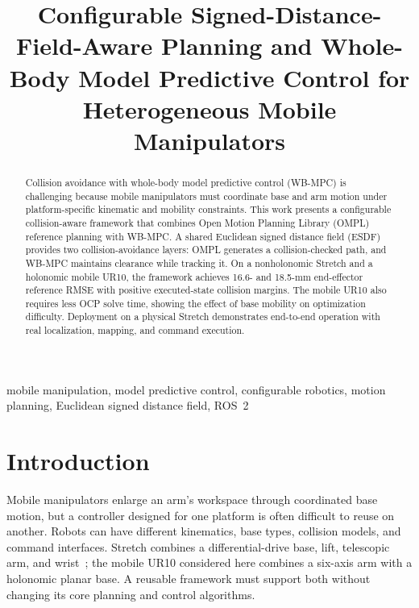 \documentclass[conference]{IEEEtran}
\begin{document}
\title{Configurable Signed-Distance-Field-Aware Planning and Whole-Body Model
Predictive Control for Heterogeneous Mobile Manipulators}

\author{
}

\maketitle

\begin{abstract}
Collision avoidance with whole-body model predictive control (WB-MPC) is
challenging because mobile manipulators must coordinate base and arm motion
under platform-specific kinematic and mobility constraints.  This work presents
a configurable collision-aware framework that combines Open Motion Planning
Library (OMPL) reference planning with WB-MPC.  A shared Euclidean signed
distance field (ESDF) provides two collision-avoidance layers: OMPL generates a
collision-checked path, and WB-MPC maintains clearance while tracking it.  On a
nonholonomic Stretch and a holonomic mobile UR10, the framework achieves 16.6-
and 18.5-mm end-effector reference RMSE with positive executed-state collision
margins.  The mobile UR10 also requires less OCP solve time, showing the effect
of base mobility on optimization difficulty.  Deployment on a physical Stretch
demonstrates end-to-end operation with real localization, mapping, and command
execution.
\end{abstract}

\begin{IEEEkeywords}
mobile manipulation, model predictive control, configurable robotics, motion
planning, Euclidean signed distance field, ROS~2
\end{IEEEkeywords}

\section{Introduction}

Mobile manipulators enlarge an arm's workspace through coordinated base motion,
but a controller designed for one platform is often difficult to reuse on
another.  Robots can have different kinematics, base types, collision models,
and command interfaces.  Stretch combines a differential-drive base, lift,
telescopic arm, and wrist~\cite{kemp2022stretch}; the mobile UR10 considered
here combines a six-axis arm with a holonomic planar base.  A reusable framework
must support both without changing its core planning and control algorithms.
\end{document}
